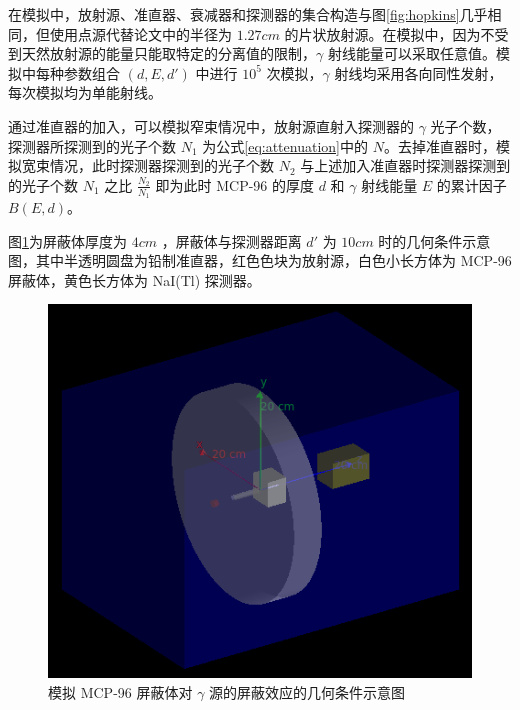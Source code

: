 在模拟中，放射源、准直器、衰减器和探测器的集合构造与图\ref{fig:hopkins}几乎相同，但使用点源代替论文\cite{hopkins_linear_2012}中的半径为 $1.27\si{cm}$ 的片状放射源。在模拟中，因为不受到天然放射源的能量只能取特定的分离值的限制，$\gamma$ 射线能量可以采取任意值。模拟中每种参数组合 $(d, E, d')$ 中进行 $10^5$ 次模拟，$\gamma$ 射线均采用各向同性发射，每次模拟均为单能射线。

通过准直器的加入，可以模拟窄束情况中，放射源直射入探测器的 $\gamma$ 光子个数，探测器所探测到的光子个数 $N_1$ 为公式\ref{eq:attenuation}中的 $N$。去掉准直器时，模拟宽束情况，此时探测器探测到的光子个数 $N_2$ 与上述加入准直器时探测器探测到的光子个数 $N_1$ 之比 $\frac{N_2}{N_1}$ 即为此时 MCP-96 的厚度 $d$ 和 $\gamma$ 射线能量 $E$ 的累计因子 $B(E, d)$。

图\ref{fig:sim}为屏蔽体厚度为 $4\si{cm}$ ，屏蔽体与探测器距离 $d'$ 为 $10\si{cm}$ 时的几何条件示意图，其中半透明圆盘为铅制准直器，红色色块为放射源，白色小长方体为 MCP-96 屏蔽体，黄色长方体为 NaI(Tl) 探测器。

\begin{figure}[H]
    \centering
    \includegraphics[width=\linewidth]{figures/sim.png}
    \caption{模拟 MCP-96 屏蔽体对 $\gamma$ 源的屏蔽效应的几何条件示意图}
    \label{fig:sim}
\end{figure}
